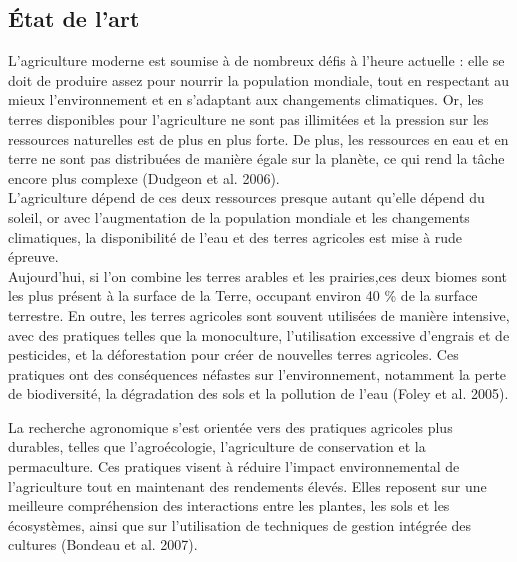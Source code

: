 \documentclass[
]{article}
\begin{document}
\subsection{État de l'art}\label{uxe9tat-de-lart}

L'agriculture moderne est soumise à de nombreux défis à l'heure actuelle
: elle se doit de produire assez pour nourrir la population mondiale,
tout en respectant au mieux l'environnement et en s'adaptant aux
changements climatiques. Or, les terres disponibles pour l'agriculture
ne sont pas illimitées et la pression sur les ressources naturelles est
de plus en plus forte. De plus, les ressources en eau et en terre ne
sont pas distribuées de manière égale sur la planète, ce qui rend la
tâche encore plus complexe (Dudgeon et al. 2006).\\
L'agriculture dépend de ces deux ressources presque autant qu'elle
dépend du soleil, or avec l'augmentation de la population mondiale et
les changements climatiques, la disponibilité de l'eau et des terres
agricoles est mise à rude épreuve.\\
Aujourd'hui, si l'on combine les terres arables et les prairies,ces deux
biomes sont les plus présent à la surface de la Terre, occupant environ
40 \% de la surface terrestre. En outre, les terres agricoles sont
souvent utilisées de manière intensive, avec des pratiques telles que la
monoculture, l'utilisation excessive d'engrais et de pesticides, et la
déforestation pour créer de nouvelles terres agricoles. Ces pratiques
ont des conséquences néfastes sur l'environnement, notamment la perte de
biodiversité, la dégradation des sols et la pollution de l'eau (Foley et
al. 2005).

\hfill\break
La recherche agronomique s'est orientée vers des pratiques agricoles
plus durables, telles que l'agroécologie, l'agriculture de conservation
et la permaculture. Ces pratiques visent à réduire l'impact
environnemental de l'agriculture tout en maintenant des rendements
élevés. Elles reposent sur une meilleure compréhension des interactions
entre les plantes, les sols et les écosystèmes, ainsi que sur
l'utilisation de techniques de gestion intégrée des cultures (Bondeau et
al. 2007).
\end{document}
